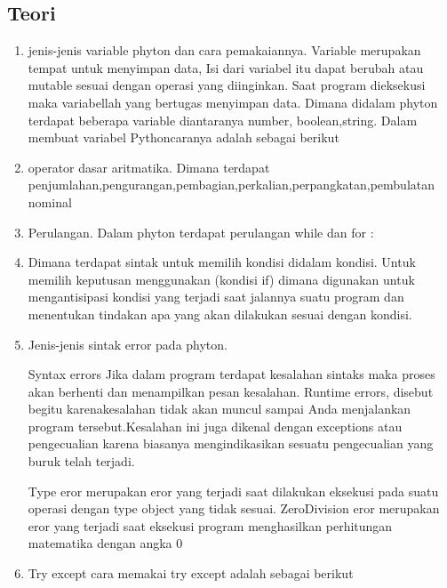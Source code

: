 \subsection{Teori}
\begin{enumerate}
\item jenis-jenis variable phyton dan cara pemakaiannya. Variable merupakan tempat untuk menyimpan data, Isi dari variabel itu dapat berubah atau mutable sesuai dengan operasi yang diinginkan. Saat program dieksekusi maka variabellah yang bertugas menyimpan data. Dimana didalam phyton terdapat beberapa variable diantaranya number, boolean,string. Dalam membuat variabel Pythoncaranya adalah sebagai berikut
    

\item operator dasar aritmatika. Dimana terdapat penjumlahan,pengurangan,pembagian,perkalian,perpangkatan,pembulatan nominal
    

\item Perulangan. Dalam phyton terdapat perulangan while dan for :
    

\item Dimana terdapat sintak untuk memilih kondisi didalam kondisi. Untuk memilih keputusan menggunakan (kondisi if) dimana digunakan untuk mengantisipasi kondisi yang terjadi saat jalannya suatu program dan menentukan tindakan apa yang akan dilakukan sesuai dengan kondisi.
    

\item Jenis-jenis sintak error pada phyton.

Syntax errors Jika dalam program terdapat kesalahan sintaks maka proses akan berhenti dan menampilkan pesan kesalahan.
Runtime errors, disebut begitu karenakesalahan tidak akan muncul sampai Anda menjalankan program tersebut.Kesalahan ini juga dikenal dengan exceptions atau pengecualian karena biasanya mengindikasikan sesuatu pengecualian yang buruk telah terjadi.

Type eror merupakan eror yang terjadi saat dilakukan eksekusi pada suatu operasi dengan type object yang tidak sesuai.
ZeroDivision eror merupakan eror yang terjadi saat eksekusi program menghasilkan perhitungan matematika dengan angka 0

\item Try except
cara memakai try except adalah sebagai berikut
    
    \end{enumerate}

